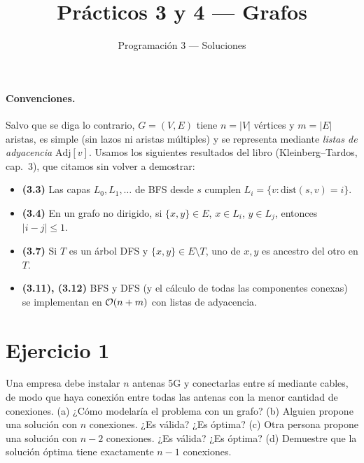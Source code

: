

\algrenewcommand{}
\newcommand{\Adj}{\mathrm{Adj}}
\newcommand{\dist}{\mathrm{dist}}
\newcommand{\Grev}{G^{\mathrm{rev}}}

\title{Prácticos 3 y 4 --- Grafos}
\author{Programación 3 --- Soluciones}
\date{}


\maketitle

\paragraph{Convenciones.} Salvo que se diga lo contrario, $G=(V,E)$ tiene $n=|V|$ vértices y
$m=|E|$ aristas, es simple (sin lazos ni aristas múltiples) y se representa mediante
\emph{listas de adyacencia} $\Adj[v]$. Usamos los siguientes resultados del libro
(Kleinberg--Tardos, cap.~3), que citamos sin volver a demostrar:
\begin{itemize}[nosep]
  \item \textbf{(3.3)} Las capas $L_0,L_1,\dots$ de BFS desde $s$ cumplen $L_i=\{v:\dist(s,v)=i\}$.
  \item \textbf{(3.4)} En un grafo no dirigido, si $\{x,y\}\in E$, $x\in L_i$, $y\in L_j$, entonces $|i-j|\le 1$.
  \item \textbf{(3.7)} Si $T$ es un árbol DFS y $\{x,y\}\in E\setminus T$, uno de $x,y$ es ancestro del otro en $T$.
  \item \textbf{(3.11), (3.12)} BFS y DFS (y el cálculo de todas las componentes conexas) se implementan en $\mathcal{O}(n+m)$ con listas de adyacencia.
\end{itemize}

\section{Ejercicio 1}
\begin{enunciado}
Una empresa debe instalar $n$ antenas 5G y conectarlas entre sí mediante cables, de modo que haya
conexión entre todas las antenas con la menor cantidad de conexiones.
(a) ¿Cómo modelaría el problema con un grafo?
(b) Alguien propone una solución con $n$ conexiones. ¿Es válida? ¿Es óptima?
(c) Otra persona propone una solución con $n-2$ conexiones. ¿Es válida? ¿Es óptima?
(d) Demuestre que la solución óptima tiene exactamente $n-1$ conexiones.
\end{enunciado}

